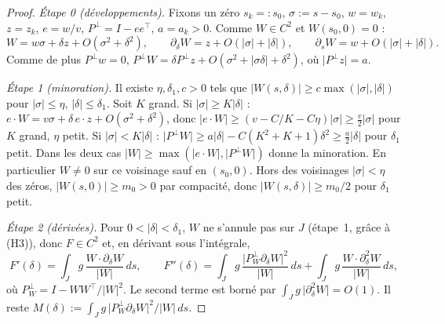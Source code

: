 \documentclass[11pt,a4paper]{article}
\theoremstyle{remark}
\newcommand{\dl}{\delta}
\begin{document}
\begin{proof}
\textit{Étape 0 (développements).} Fixons un zéro $s_k=:s_0$, $\sigma:=s-s_0$, $w=w_k$, $z=z_k$, $e=w/v$, $P^\perp=I-ee^\top$, $a=a_k>0$. Comme $W\in C^2$ et $W(s_0,0)=0$ :
\begin{equation}\label{eq:dev}
W=w\sigma+\dl z+O(\sigma^2+\dl^2),\qquad \partial_\dl W=z+O(\lvert\sigma\rvert+\lvert\dl\rvert),\qquad \partial_sW=w+O(\lvert\sigma\rvert+\lvert\dl\rvert).
\end{equation}
Comme de plus $P^\perp w=0$, $P^\perp W=\dl P^\perp z+O(\sigma^2+\lvert\sigma\dl\rvert+\dl^2)$, où $\lvert P^\perp z\rvert=a$.

\textit{Étape 1 (minoration).} Il existe $\eta,\dl_1,c>0$ tels que $\lvert W(s,\dl)\rvert\ge c\max(\lvert\sigma\rvert,\lvert\dl\rvert)$ pour $\lvert\sigma\rvert\le\eta$, $\lvert\dl\rvert\le\dl_1$. Soit $K$ grand. Si $\lvert\sigma\rvert\ge K\lvert\dl\rvert$ : $e\cdot W=v\sigma+\dl\,e\cdot z+O(\sigma^2+\dl^2)$, donc $\lvert e\cdot W\rvert\ge(v-C/K-C\eta)\lvert\sigma\rvert\ge\frac v2\lvert\sigma\rvert$ pour $K$ grand, $\eta$ petit. Si $\lvert\sigma\rvert<K\lvert\dl\rvert$ : $\lvert P^\perp W\rvert\ge a\lvert\dl\rvert-C(K^2+K+1)\dl^2\ge\frac a2\lvert\dl\rvert$ pour $\dl_1$ petit. Dans les deux cas $\lvert W\rvert\ge\max(\lvert e\cdot W\rvert,\lvert P^\perp W\rvert)$ donne la minoration. En particulier $W\ne0$ sur ce voisinage sauf en $(s_0,0)$. Hors des voisinages $\lvert\sigma\rvert<\eta$ des zéros, $\lvert W(s,0)\rvert\ge m_0>0$ par compacité, donc $\lvert W(s,\dl)\rvert\ge m_0/2$ pour $\dl_1$ petit.

\textit{Étape 2 (dérivées).} Pour $0<\lvert\dl\rvert<\dl_1$, $W$ ne s'annule pas sur $J$ (étape~1, grâce à (H3)), donc $F\in C^2$ et, en dérivant sous l'intégrale,
\[
F'(\dl)=\int_J g\,\frac{W\cdot\partial_\dl W}{\lvert W\rvert}\,ds,\qquad
F''(\dl)=\int_J g\,\frac{\lvert P_W^\perp\partial_\dl W\rvert^2}{\lvert W\rvert}\,ds+\int_J g\,\frac{W\cdot\partial^2_\dl W}{\lvert W\rvert}\,ds ,
\]
où $P_W^\perp=I-WW^\top/\lvert W\rvert^2$. Le second terme est borné par $\int_Jg\,\lvert\partial_\dl^2W\rvert=O(1)$. Il reste $M(\dl):=\int_Jg\,\lvert P_W^\perp\partial_\dl W\rvert^2/\lvert W\rvert\,ds$.


\end{proof}
\end{document}
